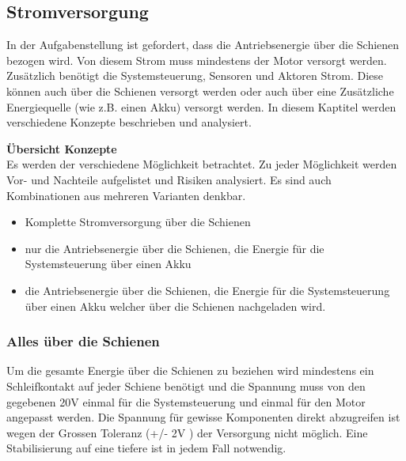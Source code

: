 \documentclass[../../../main.tex]{subfiles}
\begin{document}
    \subsection{Stromversorgung}
    In der Aufgabenstellung ist gefordert, dass die Antriebsenergie über die Schienen bezogen wird. Von diesem Strom muss mindestens der Motor versorgt werden. Zusätzlich benötigt die Systemsteuerung, Sensoren und Aktoren Strom. Diese können auch über die Schienen versorgt werden oder auch über eine Zusätzliche Energiequelle (wie z.B. einen Akku) versorgt werden.
    In diesem Kaptitel werden verschiedene Konzepte beschrieben und analysiert.

    \textbf{Übersicht Konzepte}\\
    Es werden der verschiedene Möglichkeit betrachtet. Zu jeder Möglichkeit werden Vor- und Nachteile aufgelistet und Risiken analysiert. Es sind auch Kombinationen aus mehreren Varianten denkbar.

    \begin{itemize}
        \item Komplette Stromversorgung über die Schienen
        \item nur die Antriebsenergie über die Schienen, die Energie für die Systemsteuerung über einen Akku 
        \item die Antriebsenergie über die Schienen, die Energie für die Systemsteuerung über einen Akku welcher über die Schienen nachgeladen wird.
    \end{itemize}
    
    \subsubsection{Alles über die Schienen}
    Um die gesamte Energie über die Schienen zu beziehen wird mindestens ein Schleifkontakt auf jeder Schiene benötigt und die Spannung muss von den gegebenen 20V einmal für die Systemsteuerung und einmal für den Motor angepasst werden. Die Spannung für gewisse Komponenten direkt abzugreifen ist wegen der Grossen Toleranz (+/- 2V ) der Versorgung nicht möglich. Eine Stabilisierung auf eine tiefere ist in jedem Fall notwendig. 
    
\end{document}
